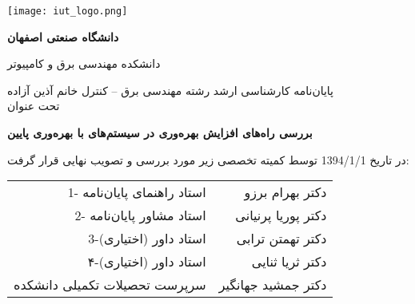 \thispagestyle{empty}
\begin{center}
\texttt{[image: iut\_logo.png]}
\vspace{0.4cm}

\textbf{دانشگاه صنعتی اصفهان}\\
\vspace{0.4cm}

{\large
	دانشکده مهندسی برق و کامپیوتر
}
\vspace{1.8cm}

\vfill

{\Large
	پایان‌نامه کارشناسی ارشد رشته مهندسی برق -- کنترل خانم آذین آزاده\\
	\vspace{.3cm}
	تحت عنوان\\
}


\end{center}
\vfill
\vspace{2.5cm}

{\large
	\textbf{بررسی راه‌های افزایش بهره‌وری در سیستم‌های با بهره‌وری پایین}
}

\vspace*{2cm}

در تاریخ 1394/1/1 توسط کمیته تخصصی زیر مورد بررسی و تصویب نهایی قرار گرفت:\\
\vspace{0.8cm}

{\normalsize
	
	\begin{tabular}{rr}
	\vspace*{.8cm}
	1- استاد راهنمای پایان‌نامه  & \hspace{2cm} دکتر بهرام برزو \\
	\vspace{.8cm}
	2- استاد مشاور پایان‌نامه  &\hspace{2cm} دکتر پوریا پرنیانی \\
	\vspace{.8cm}
	3-استاد داور (اختیاری) &\hspace{2cm} دکتر تهمتن ترابی \\
	\vspace{.8cm}
	۴-استاد داور (اختیاری) &\hspace{2cm} دکتر ثریا ثنایی\\
	\vspace{.8cm}
	سرپرست تحصیلات تکمیلی دانشکده &\hspace{2cm} دکتر جمشید جهانگیر\\
	\end{tabular}
}
\restoregeometry
\pagebreak

